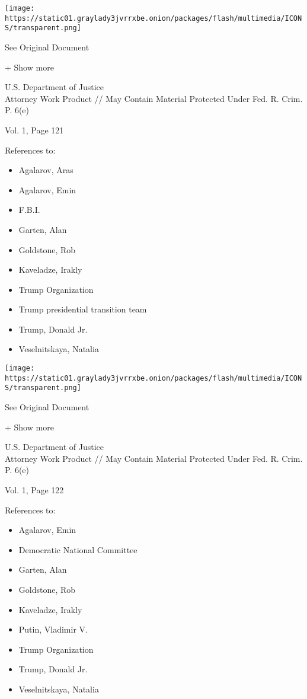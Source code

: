 \protect\hyperlink{}{}

\texttt{[image: https://static01.graylady3jvrrxbe.onion/packages/flash/multimedia/ICONS/transparent.png]}

See Original Document

+ Show more

U.S. Department of Justice\\
Attorney Work Product // May Contain Material Protected Under Fed. R.
Crim. P. 6(e)

Vol. 1, Page 121

References to:

\begin{itemize}
\tightlist
\item
  Agalarov, Aras
\item
  Agalarov, Emin
\item
  F.B.I.
\item
  Garten, Alan
\item
  Goldstone, Rob
\item
  Kaveladze, Irakly
\item
  Trump Organization
\item
  Trump presidential transition team
\item
  Trump, Donald Jr.
\item
  Veselnitskaya, Natalia
\end{itemize}

\protect\hyperlink{}{}

\texttt{[image: https://static01.graylady3jvrrxbe.onion/packages/flash/multimedia/ICONS/transparent.png]}

See Original Document

+ Show more

U.S. Department of Justice\\
Attorney Work Product // May Contain Material Protected Under Fed. R.
Crim. P. 6(e)

Vol. 1, Page 122

References to:

\begin{itemize}
\tightlist
\item
  Agalarov, Emin
\item
  Democratic National Committee
\item
  Garten, Alan
\item
  Goldstone, Rob
\item
  Kaveladze, Irakly
\item
  Putin, Vladimir V.
\item
  Trump Organization
\item
  Trump, Donald Jr.
\item
  Veselnitskaya, Natalia
\end{itemize}

